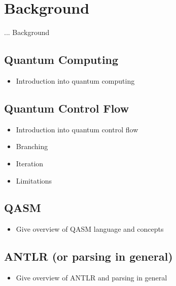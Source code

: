 \chapter{Background}
... Background

\section{Quantum Computing}
\begin{itemize}
    \item Introduction into quantum computing
\end{itemize}


\section{Quantum Control Flow}
\begin{itemize}
    \item Introduction into quantum control flow
    \item Branching
    \item Iteration
    \item Limitations
\end{itemize}


\section{QASM}
\begin{itemize}
    \item Give overview of QASM language and concepts
\end{itemize}

\section{ANTLR (or parsing in general)}
\begin{itemize}
    \item Give overview of ANTLR and parsing in general
\end{itemize}